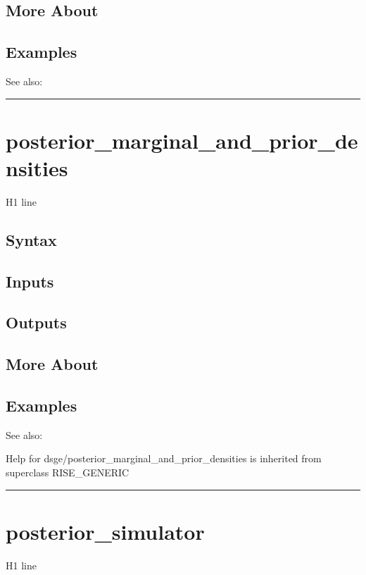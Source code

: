 \documentclass[letterpaper,10pt,english]{sphinxmanual}
\begin{document}
\subsection{More About}
\label{classes/models/@dsge/dsge:id114}

\subsection{Examples}
\label{classes/models/@dsge/dsge:id115}
See also:


\bigskip\hrule{}\bigskip



\section{posterior\_marginal\_and\_prior\_densities}
\label{classes/models/@dsge/dsge:id116}\label{classes/models/@dsge/dsge:posterior-marginal-and-prior-densities}
H1 line


\subsection{Syntax}
\label{classes/models/@dsge/dsge:id117}

\subsection{Inputs}
\label{classes/models/@dsge/dsge:id118}

\subsection{Outputs}
\label{classes/models/@dsge/dsge:id119}

\subsection{More About}
\label{classes/models/@dsge/dsge:id120}

\subsection{Examples}
\label{classes/models/@dsge/dsge:id121}
See also:

Help for dsge/posterior\_marginal\_and\_prior\_densities is inherited from superclass RISE\_GENERIC


\bigskip\hrule{}\bigskip



\section{posterior\_simulator}
\label{classes/models/@dsge/dsge:posterior-simulator}\label{classes/models/@dsge/dsge:id122}
H1 line
\end{document}
